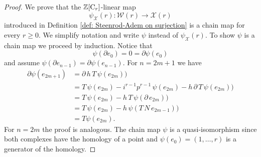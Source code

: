 \begin{proof}
	We prove that the $\mathbb{Z}[\mathrm{C}_r]$-linear map
	\begin{equation*}
	\psi_{\mathcal X}(r) : \mathcal W(r) \to \mathcal X(r)
	\end{equation*}
	introduced in Definition \ref{def: Steenrod-Adem on surjection} is a chain map for every $r \geq 0$. We simplify notation and write $\psi$ instead of $\psi_{\mathcal X}(r)$. To show $\psi$ is a chain map we proceed by induction. Notice that
	\begin{equation*}
	\psi(\partial e_0) = 0 = \partial \psi(e_0)
	\end{equation*}
	and assume $\psi(\partial e_{n-1}) = \partial \psi(e_{n-1})$. For $n = 2m+1$ we have
	\begin{align*}
	\partial \psi(e_{2m+1}) 
	& =
	\partial\, h\, T\, \psi(e_{2m}) \big) \\
	& =
	T\, \psi(e_{2m}) - i^{r-1} p^{r-1}\, \psi(e_{2m}) -
	h\, \partial\, T\, \psi(e_{2m}) \big) \\
	& =
	T\, \psi(e_{2m}) - 
	h\, T\, \psi(\partial\, e_{2m}) \big) \\
	& =
	T\, \psi(e_{2m}) - 
	h\, \psi(T\,N\, e_{2m-1}) \big) \\
	& = 
	T \psi(e_{2m}).
	\end{align*}
	For $n = 2m$ the proof is analogous. The chain map $\psi$ is a quasi-isomorphism since both complexes have the homology of a point and $\psi(e_0) = (1, \dots, r)$ is a generator of the homology.
\end{proof}